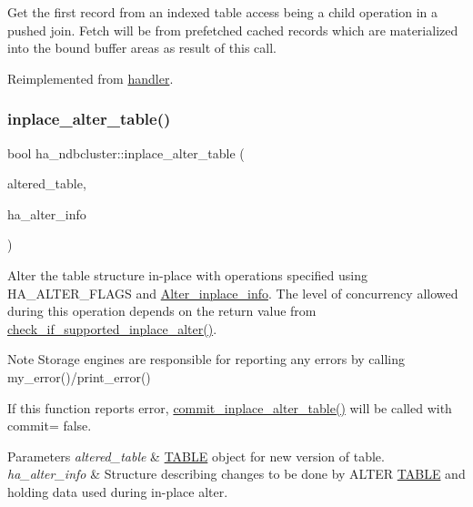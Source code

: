 Get the first record from an indexed table access being a child operation in a pushed join. Fetch will be from prefetched cached records which are materialized into the bound buffer areas as result of this call. 

Reimplemented from \mbox{\hyperlink{classhandler}{handler}}.

\mbox{\label{classha__ndbcluster_a5ff1e368997d6822e3285080fade11fe}} 
\subsubsection{\texorpdfstring{inplace\+\_\+alter\+\_\+table()}{inplace\_alter\_table()}}
{\footnotesize\ttfamily bool ha\+\_\+ndbcluster\+::inplace\+\_\+alter\+\_\+table (\begin{DoxyParamCaption}\item[{\mbox{\hyperlink{structTABLE}{T\+A\+B\+LE}} $\ast$}]{altered\+\_\+table,  }\item[{\mbox{\hyperlink{classAlter__inplace__info}{Alter\+\_\+inplace\+\_\+info}} $\ast$}]{ha\+\_\+alter\+\_\+info }\end{DoxyParamCaption})\hspace{0.3cm}{\ttfamily [virtual]}}

Alter the table structure in-\/place with operations specified using H\+A\+\_\+\+A\+L\+T\+E\+R\+\_\+\+F\+L\+A\+GS and \mbox{\hyperlink{classAlter__inplace__info}{Alter\+\_\+inplace\+\_\+info}}. The level of concurrency allowed during this operation depends on the return value from \mbox{\hyperlink{classha__ndbcluster_a178fe8e973508932db3d3d6ca3a625a9}{check\+\_\+if\+\_\+supported\+\_\+inplace\+\_\+alter()}}.

\begin{DoxyNote}{Note}
Storage engines are responsible for reporting any errors by calling my\+\_\+error()/print\+\_\+error()

If this function reports error, \mbox{\hyperlink{classha__ndbcluster_af55db4a0efc9c99947b72b4bfc83b8ad}{commit\+\_\+inplace\+\_\+alter\+\_\+table()}} will be called with commit= false.
\end{DoxyNote}

\begin{DoxyParams}{Parameters}
{\em altered\+\_\+table} & \mbox{\hyperlink{structTABLE}{T\+A\+B\+LE}} object for new version of table. \\
\hline
{\em ha\+\_\+alter\+\_\+info} & Structure describing changes to be done by A\+L\+T\+ER \mbox{\hyperlink{structTABLE}{T\+A\+B\+LE}} and holding data used during in-\/place alter.\\
\hline
\end{DoxyParams}

